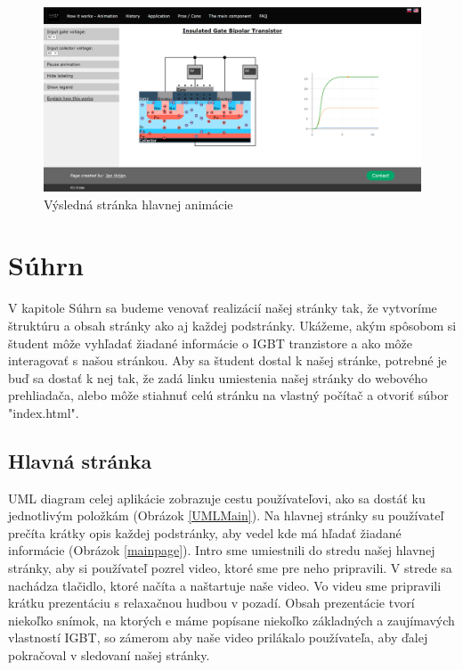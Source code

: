 \begin{figure}[!htbp]
    \centering
    \includegraphics[width=16cm]{img/zanimation.PNG}
    \caption{Výsledná stránka hlavnej animácie}
    \label{zanimation}
\end{figure}

\section{Súhrn}
\noindent V kapitole Súhrn sa budeme venovať realizácií našej stránky tak, že vytvoríme štruktúru a obsah  stránky ako aj každej podstránky. Ukážeme,  akým spôsobom si študent môže vyhľadať žiadané informácie o \acrshort{IGBT} tranzistore a ako môže interagovať s našou stránkou. Aby sa študent dostal k našej stránke, potrebné je buď sa dostať k nej  tak, že  zadá linku umiestenia našej stránky do webového prehliadača, alebo môže stiahnuť celú stránku na vlastný počítač a otvoriť súbor "index.html".

\subsection{Hlavná stránka}
\noindent UML diagram celej aplikácie zobrazuje cestu používateľovi, ako sa dostáť ku jednotlivým položkám (Obrázok \ref{UMLMain}). Na hlavnej stránky su používateľ prečíta krátky opis každej podstránky, aby vedel kde má hľadať žiadané informácie (Obrázok \ref{mainpage}). Intro sme umiestnili do stredu našej hlavnej stránky, aby si používateľ pozrel video, ktoré sme pre neho pripravili. V strede sa nachádza tlačidlo, ktoré načíta a naštartuje naše video. Vo videu sme pripravili krátku prezentáciu s relaxačnou hudbou v pozadí. Obsah  prezentácie tvorí niekoľko snímok, na ktorých e máme popísane niekoľko základných a zaujímavých vlastností \acrshort{IGBT}, so zámerom aby  naše video prilákalo používateľa, aby ďalej pokračoval v sledovaní našej stránky.

